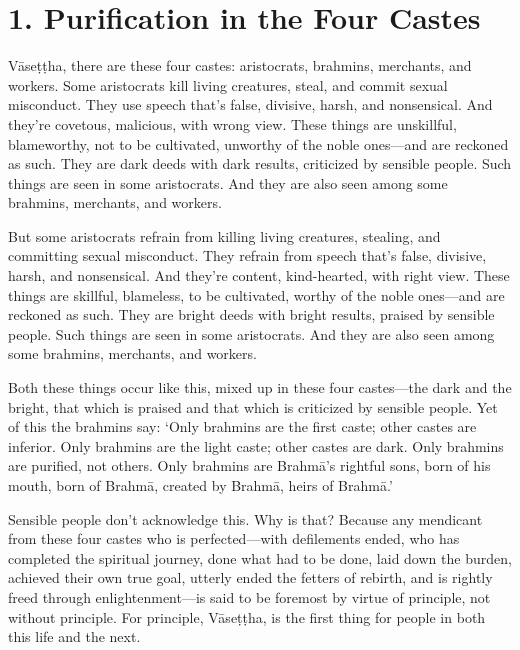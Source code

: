 \documentclass[12pt,openany]{book}%
\begin{document}
\section*{1. Purification in the Four Castes }

\textsanskrit{Vāseṭṭha}, there are these four castes: aristocrats, brahmins, merchants, and workers. Some aristocrats kill living creatures, steal, and commit sexual misconduct. They use speech that’s false, divisive, harsh, and nonsensical. And they’re covetous, malicious, with wrong view. These things are unskillful, blameworthy, not to be cultivated, unworthy of the noble ones—and are reckoned as such. They are dark deeds with dark results, criticized by sensible people. Such things are seen in some aristocrats. And they are also seen among some brahmins, merchants, and workers. 

But some aristocrats refrain from killing living creatures, stealing, and committing sexual misconduct. They refrain from speech that’s false, divisive, harsh, and nonsensical. And they’re content, kind-hearted, with right view. These things are skillful, blameless, to be cultivated, worthy of the noble ones—and are reckoned as such. They are bright deeds with bright results, praised by sensible people. Such things are seen in some aristocrats. And they are also seen among some brahmins, merchants, and workers. 

Both these things occur like this, mixed up in these four castes—the dark and the bright, that which is praised and that which is criticized by sensible people. Yet of this the brahmins say: ‘Only brahmins are the first caste; other castes are inferior. Only brahmins are the light caste; other castes are dark. Only brahmins are purified, not others. Only brahmins are \textsanskrit{Brahmā}’s rightful sons, born of his mouth, born of \textsanskrit{Brahmā}, created by \textsanskrit{Brahmā}, heirs of \textsanskrit{Brahmā}.’ 

Sensible people don’t acknowledge this. Why is that? Because any mendicant from these four castes who is perfected—with defilements ended, who has completed the spiritual journey, done what had to be done, laid down the burden, achieved their own true goal, utterly ended the fetters of rebirth, and is rightly freed through enlightenment—is said to be foremost by virtue of principle, not without principle. For principle, \textsanskrit{Vāseṭṭha}, is the first thing for people in both this life and the next. 
\end{document}
